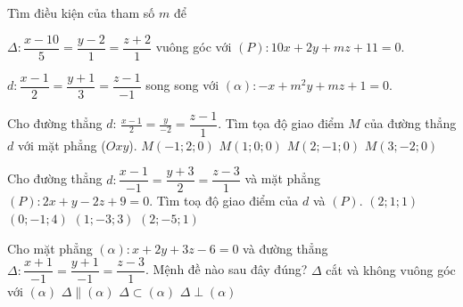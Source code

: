 \begin{vd}
	Tìm điều kiện của tham số $m$ để
	\begin{enumEX}[a)]{1}
		\item $ \Delta:\dfrac{x-10}{5}=\dfrac{y-2}{1}=\dfrac{z+2}{1}$ vuông góc với $(P):10x+2y+mz+11=0$.
		\item $d\colon \dfrac{x-1}{2}=\dfrac{y+1}{3}=\dfrac{z-1}{-1}$ song song với $(\alpha)\colon -x+m^2y+mz+1=0$.
	\end{enumEX}
\end{vd}
\baitaptn
\setcounter{ex}{0}
\begin{ex}
	Cho đường thẳng $d:\,\displaystyle\frac{x-1}{2}=\frac{y}{-2}=\dfrac{z-1}{1}$. Tìm tọa độ giao điểm $ M $ của đường thẳng $ d $ với mặt phẳng ($ Oxy $).
	\choice
	{\True$M(-1;2;0) $}
	{$ M(1;0;0)$}
	{$ M(2;-1;0)$}
	{$ M(3;-2;0)$}
	\loigiai{
	}
\end{ex}

\begin{ex}
	Cho đường thẳng $d: \dfrac{x-1}{-1}=\dfrac{y+3}{2}=\dfrac{z-3}{1}$ và mặt phẳng $(P): 2x+y-2z+9=0$. Tìm toạ độ giao điểm của $d$ và $(P)$.
	\choice
	{$(2; 1; 1)$}
	{\True $(0;-1;4)$}
	{$(1; -3; 3)$}
	{$(2; -5; 1)$} 
	\loigiai{
	}
\end{ex}
\begin{ex}
	Cho mặt phẳng $(\alpha)\colon x+2y+3z-6=0$ và đường thẳng $\Delta\colon\dfrac{x+1}{-1}=\dfrac{y+1}{-1}=\dfrac{z-3}{1}$. Mệnh đề nào sau đây đúng?
	\choice
	{$\Delta$ cắt và không vuông góc với $(\alpha)$}
	{$\Delta\parallel (\alpha)$}
	{\True $\Delta\subset (\alpha)$}
	{$\Delta \perp (\alpha)$}
\end{ex}

